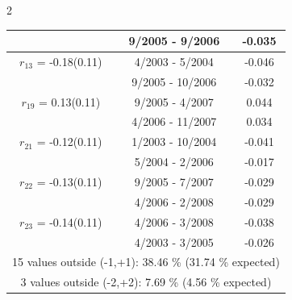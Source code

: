 \begin{multicols}{2}
{\begin{tabular}{ccc}
  &        9/2005 -  9/2006 &       -0.035  \vspace{-.02in}   \\ \hline 
    $r_{13}$ = -0.18(0.11) &       4/2003 -  5/2004 &       -0.046    \vspace{-.10in} \\ 
  &        9/2005 - 10/2006 &       -0.032  \vspace{-.02in}   \\ \hline 
    $r_{19}$ = 0.13(0.11) &       9/2005 -  4/2007 &        0.044   \vspace{-.10in} \\  
&        4/2006 - 11/2007 &        0.034  \vspace{-.02in} \\ \hline 
  $r_{21}$ = -0.12(0.11) &       1/2003 - 10/2004 &       -0.041    \vspace{-.10in} \\ 
  &        5/2004 -  2/2006 &       -0.017  \vspace{-.02in}   \\ \hline 
    $r_{22}$ = -0.13(0.11) &       9/2005 -  7/2007 &       -0.029    \vspace{-.10in} \\ 
  &        4/2006 -  2/2008 &       -0.029  \vspace{-.02in}   \\ \hline 
    $r_{23}$ = -0.14(0.11) &       4/2006 -  3/2008 &       -0.038    \vspace{-.10in} \\ 
  &        4/2003 -  3/2005 &       -0.026  \vspace{-.02in}   \\ \hline 
  \multicolumn{3}{c}{              15 values outside (-1,+1): 38.46  \% (31.74  \% expected)}\vspace{-.10in} \\ 
\multicolumn{3}{c}{               3 values outside (-2,+2):  7.69 \%  (4.56 \% expected) } \\
 \end{tabular} \\ 
 } 
\end{multicols} 
